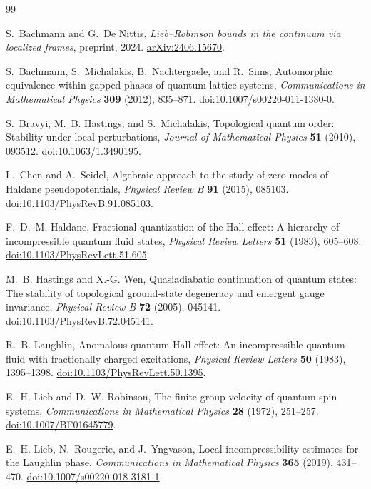 \begingroup\raggedright
\begin{thebibliography}{99}

S.~Bachmann and G.~De Nittis,
\emph{Lieb--Robinson bounds in the continuum via localized frames},
preprint, 2024.
\href{https://arxiv.org/abs/2406.15670}{arXiv:2406.15670}.

S.~Bachmann, S.~Michalakis, B.~Nachtergaele, and R.~Sims,
Automorphic equivalence within gapped phases of quantum lattice systems,
\emph{Communications in Mathematical Physics} \textbf{309} (2012), 835--871.
\href{https://doi.org/10.1007/s00220-011-1380-0}{doi:10.1007/s00220-011-1380-0}.

S.~Bravyi, M.~B. Hastings, and S.~Michalakis,
Topological quantum order: Stability under local perturbations,
\emph{Journal of Mathematical Physics} \textbf{51} (2010), 093512.
\href{https://doi.org/10.1063/1.3490195}{doi:10.1063/1.3490195}.

L.~Chen and A.~Seidel,
Algebraic approach to the study of zero modes of Haldane pseudopotentials,
\emph{Physical Review B} \textbf{91} (2015), 085103.
\href{https://doi.org/10.1103/PhysRevB.91.085103}{doi:10.1103/PhysRevB.91.085103}.

F.~D.~M. Haldane,
Fractional quantization of the Hall effect: A hierarchy of incompressible
quantum fluid states,
\emph{Physical Review Letters} \textbf{51} (1983), 605--608.
\href{https://doi.org/10.1103/PhysRevLett.51.605}{doi:10.1103/PhysRevLett.51.605}.

M.~B. Hastings and X.-G. Wen,
Quasiadiabatic continuation of quantum states: The stability of topological
ground-state degeneracy and emergent gauge invariance,
\emph{Physical Review B} \textbf{72} (2005), 045141.
\href{https://doi.org/10.1103/PhysRevB.72.045141}{doi:10.1103/PhysRevB.72.045141}.

R.~B. Laughlin,
Anomalous quantum Hall effect: An incompressible quantum fluid with
fractionally charged excitations,
\emph{Physical Review Letters} \textbf{50} (1983), 1395--1398.
\href{https://doi.org/10.1103/PhysRevLett.50.1395}{doi:10.1103/PhysRevLett.50.1395}.

E.~H. Lieb and D.~W. Robinson,
The finite group velocity of quantum spin systems,
\emph{Communications in Mathematical Physics} \textbf{28} (1972), 251--257.
\href{https://doi.org/10.1007/BF01645779}{doi:10.1007/BF01645779}.

E.~H. Lieb, N.~Rougerie, and J.~Yngvason,
Local incompressibility estimates for the Laughlin phase,
\emph{Communications in Mathematical Physics} \textbf{365} (2019), 431--470.
\href{https://doi.org/10.1007/s00220-018-3181-1}{doi:10.1007/s00220-018-3181-1}.


\end{thebibliography}
